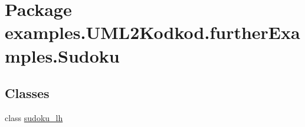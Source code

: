 \hypertarget{namespaceexamples_1_1_u_m_l2_kodkod_1_1further_examples_1_1_sudoku}{\section{Package examples.\-U\-M\-L2\-Kodkod.\-further\-Examples.\-Sudoku}
\label{namespaceexamples_1_1_u_m_l2_kodkod_1_1further_examples_1_1_sudoku}
}
\subsection*{Classes}
\begin{DoxyCompactItemize}
\item 
class \hyperlink{classexamples_1_1_u_m_l2_kodkod_1_1further_examples_1_1_sudoku_1_1sudoku__lh}{sudoku\-\_\-lh}
\end{DoxyCompactItemize}
